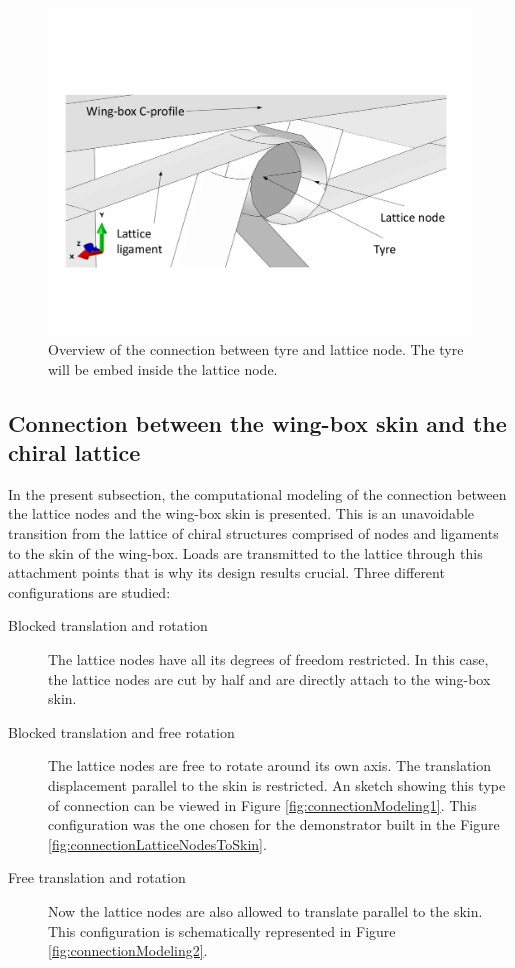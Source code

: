     \begin{figure}[!htpb]
      \centering
      \includegraphics[width=0.8 \textwidth]{figures/model/tyre-connection}
      \caption[Overview of the connection between tyre and lattice node]{Overview of the connection between tyre and lattice node. The tyre will be embed inside the lattice node.}\label{fig:tyre-connection}
    \end{figure}

  \clearpage
  \subsection{Connection between the wing-box skin and the chiral lattice} \label{subsec:connections_computationalModel}

    In the present subsection, the computational modeling of the connection between the lattice nodes and the wing-box skin is presented. This is an unavoidable transition from the lattice of chiral structures comprised of nodes and ligaments to the skin of the wing-box. Loads are transmitted to the lattice through this attachment points that is why its design results crucial. Three different configurations are studied:

    \begin{description}
      \item[Blocked translation and rotation] The lattice nodes have all its degrees of freedom restricted. In this case, the lattice nodes are cut by half and are directly attach to the wing-box skin.
      \item[Blocked translation and free rotation] The lattice nodes are free to rotate around its own axis. The translation displacement parallel to the skin is restricted. An sketch showing this type of connection can be viewed in Figure \ref{fig:connectionModeling1}. This configuration was the one chosen for the demonstrator built in the Figure \ref{fig:connectionLatticeNodesToSkin}.
      \item[Free translation and rotation] Now the lattice nodes are also allowed to translate parallel to the skin. This configuration is schematically represented in Figure \ref{fig:connectionModeling2}.
    \end{description}

